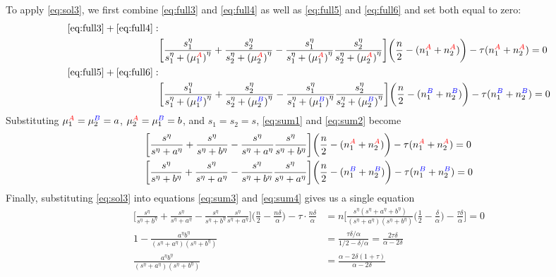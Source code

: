 \documentclass[10pt]{article}
\theoremstyle{remark}
\newcommand{\A}{{\color{red}A}}
\newcommand{\B}{{\color{blue}B}}
\begin{document}
To apply \eqref{eq:sol3}, we first combine \eqref{eq:full3} and \eqref{eq:full4} as well as \eqref{eq:full5} and \eqref{eq:full6} and set both equal to zero:
\begin{align}
    \eqref{eq:full3} + \eqref{eq:full4}:&
    \nonumber\\
    & \bigg[\frac{s_{1}^\eta}{s_{1}^\eta + {(\mu_1^{\A})}^\eta}
    + \frac{s_{2}^\eta}{s_{2}^\eta + {(\mu_2^{\A})}^\eta}
    - \frac{s_{1}^\eta}{s_{1}^\eta + {(\mu_1^{\A})}^\eta}  \frac{s_{2}^\eta}{s_{2}^\eta + {(\mu_2^{\A})}^\eta} \bigg]
    \bigg(\frac{n}{2} - (n_{1}^{\A} + n_{2}^{\A}) \bigg) - \tau (n_{1}^{\A} + n_{2}^{\A}) = 0
    \label{eq:sum1}\\
    \eqref{eq:full5} + \eqref{eq:full6}:&
     \nonumber\\
    & \bigg[\frac{s_{1}^\eta}{s_{1}^\eta + {(\mu_1^{\B})}^\eta} 
    + \frac{s_{2}^\eta}{s_{2}^\eta + {(\mu_2^{\B})}^\eta}
    - \frac{s_{1}^\eta}{s_{1}^\eta + {(\mu_1^{\B})}^\eta}  \frac{s_{2}^\eta}{s_{2}^\eta + {(\mu_2^{\B})}^\eta} \bigg]
    \bigg(\frac{n}{2} - (n_{1}^{\B} + n_{2}^{\B}) \bigg) - \tau (n_{1}^{\B} + n_{2}^{\B}) = 0
     \label{eq:sum2}
\end{align}
Substituting $\mu_{1}^{\A} = \mu_{2}^{\B} = a$, $\mu_{2}^{\A} = \mu_{1}^{\B} = b$, and $s_1 = s_2 = s$, \eqref{eq:sum1} and \eqref{eq:sum2} become
\begin{align}
    & \bigg[\frac{s^\eta}{s^\eta + {a}^\eta}
    + \frac{s^\eta}{s^\eta + {b}^\eta}
    - \frac{s^\eta}{s^\eta + {a}^\eta}  \frac{s^\eta}{s^\eta + {b}^\eta} \bigg]
    \bigg(\frac{n}{2} - (n_{1}^{\A} + n_{2}^{\A}) \bigg) - \tau (n_{1}^{\A} + n_{2}^{\A}) = 0
    \label{eq:sum3}\\
    & \bigg[\frac{s^\eta}{s^\eta + {b}^\eta} 
    + \frac{s^\eta}{s^\eta + {a}^\eta}
    - \frac{s^\eta}{s^\eta + {b}^\eta}  \frac{s^\eta}{s^\eta + {a}^\eta} \bigg]
    \bigg(\frac{n}{2} - (n_{1}^{\B} + n_{2}^{\B}) \bigg) - \tau (n_{1}^{\B} + n_{2}^{\B}) = 0
     \label{eq:sum4}
\end{align}
Finally, substituting \eqref{eq:sol3} into equations \eqref{eq:sum3} and \eqref{eq:sum4} gives us a single equation
\begin{align}
        \bigg[\frac{s^\eta}{s^\eta + {b}^\eta} 
    + \frac{s^\eta}{s^\eta + {a}^\eta}
    - \frac{s^\eta}{s^\eta + {b}^\eta}  \frac{s^\eta}{s^\eta + {a}^\eta} \bigg] \bigg(\frac{n}{2} - \frac{n\delta}{\alpha} \bigg) - \tau\cdot \frac{n\delta}{\alpha}
    & = n\bigg[ \frac{s^\eta (s^\eta + {a}^\eta + {b}^\eta)}{(s^\eta + {a}^\eta)(s^\eta + {b}^\eta)} \bigg(\frac{1}{2} - \frac{\delta}{\alpha} \bigg) - \frac{\tau \delta}{\alpha}\bigg]
    = 0 \nonumber\\
   1 - \frac{{a}^\eta {b}^\eta}{(s^\eta + {a}^\eta)(s^\eta + {b}^\eta)}  & = \frac{\tau \delta/\alpha}{1/2 - \delta/\alpha }
   = \frac{2\tau\delta}{\alpha - 2\delta}\nonumber\\
   \frac{{a}^\eta {b}^\eta}{(s^\eta + {a}^\eta)(s^\eta + {b}^\eta)}
   & = \frac{\alpha - 2\delta (1+\tau)}{\alpha - 2\delta}
    \label{eq:sum5}
\end{align}
\end{document}
